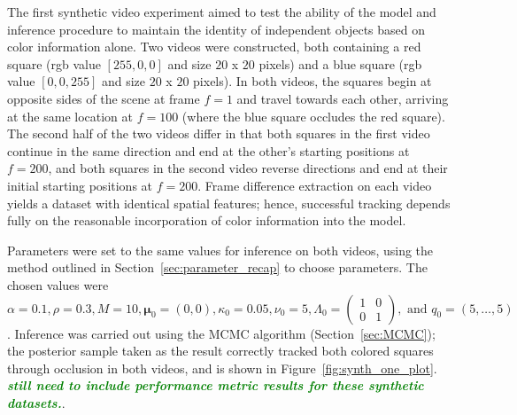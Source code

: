 \documentclass[smallcondensed, final]{svjour3}
\newcommand{\willie}[1]{\textcolor{green}{\textsf{\emph{\textbf{\textcolor{green}{#1}}}}}}
\begin{document}
The first synthetic video experiment aimed to test the ability of the model and inference procedure to maintain the identity of independent objects based on color information alone. Two videos were constructed, both containing a red square (rgb value $[255,0,0]$ and size $20$ x $20$ pixels) and a blue square (rgb value $[0,0,255]$ and size $20$ x $20$ pixels). In both videos, the squares begin at opposite sides of the scene at frame $f=1$ and travel towards each other, arriving at the same location at $f=100$ (where the blue square occludes the red square). The second half of the two videos differ in that both squares in the first video continue in the same direction and end at the other's starting positions at $f=200$, and both squares in the second video reverse directions and end at their initial starting positions at $f=200$. Frame difference extraction on each video yields a dataset with identical spatial features; hence, successful tracking depends fully on the reasonable incorporation of color information into the model.

Parameters were set to the same values for inference on both videos, using the method outlined in Section~\ref{sec:parameter_recap} to choose parameters. The chosen values were $\alpha = 0.1, \rho = 0.3, M = 10, \boldsymbol{\mu}_{0} = (0,0), \kappa_{0} = 0.05, \nu_{0} = 5, \Lambda_{0} = \left( \begin{smallmatrix} 1&0\\ 0&1 \end{smallmatrix} \right), \text{ and } q_{0} = (5, \ldots, 5)$. Inference was carried out using the MCMC algorithm (Section~\ref{sec:MCMC}); the posterior sample taken as the result correctly tracked both colored squares through occlusion in both videos, and is shown in Figure~\ref{fig:synth_one_plot}. \willie{still need to include performance metric results for these synthetic datasets.}.
\end{document}
